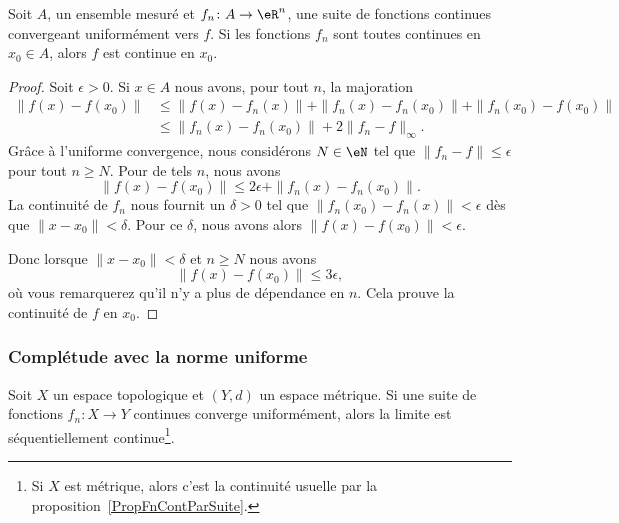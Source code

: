 \begin{theorem}			\label{ThoUnigCvCont}
    Soit \( A\), un ensemble mesuré et \( f_n\colon A\to \eR^n\), une suite de fonctions continues convergeant uniformément vers \( f\). Si les fonctions \( f_n\) sont toutes continues en \( x_0\in A\), alors \( f\) est continue en \( x_0\).
\end{theorem}

\begin{proof}
    Soit \( \epsilon>0\). Si \( x\in A\) nous avons, pour tout \( n\), la majoration
    \begin{subequations}
        \begin{align}
            \| f(x)-f(x_0) \|&\leq \| f(x)-f_n(x) \|+\| f_n(x)-f_n(x_0) \|+\| f_n(x_0)-f(x_0) \|\\
            &\leq\| f_n(x)-f_n(x_0) \|+2\| f_n-f \|_{\infty}.
        \end{align}
    \end{subequations}
    Grâce à l'uniforme convergence, nous considérons \(N\in \eN\) tel que \( \| f_n-f \|\leq \epsilon\) pour tout \( n\geq N\). Pour de tels \( n\), nous avons
    \begin{equation}
        \| f(x)-f(x_0) \|\leq 2\epsilon+\| f_n(x)-f_n(x_0) \|.
    \end{equation}
    La continuité de \( f_n\) nous fournit un \( \delta>0\) tel que \( \| f_n(x_0)-f_n(x) \|<\epsilon\) dès que \( \| x-x_0 \|<\delta\). Pour ce \( \delta\), nous avons alors \( \| f(x)-f(x_0) \|<\epsilon\).

    Donc lorsque \( \| x-x_0 \|<\delta\) et \( n\geq N\) nous avons
    \begin{equation}
        \| f(x)-f(x_0) \|\leq 3\epsilon,
    \end{equation}
    où vous remarquerez qu'il n'y a plus de dépendance en \( n\). Cela prouve la continuité de \( f\) en \( x_0\).
\end{proof}

\subsubsection{Complétude avec la norme uniforme}

\begin{proposition}\label{PropCZslHBx}
    Soit \( X\) un espace topologique et \( (Y,d)\) un espace métrique. Si une suite de fonctions \( f_n\colon X\to Y\) continues converge uniformément, alors la limite est séquentiellement continue\footnote{Si \( X\) est métrique, alors c'est la continuité usuelle par la proposition~\ref{PropFnContParSuite}.}.
\end{proposition}

